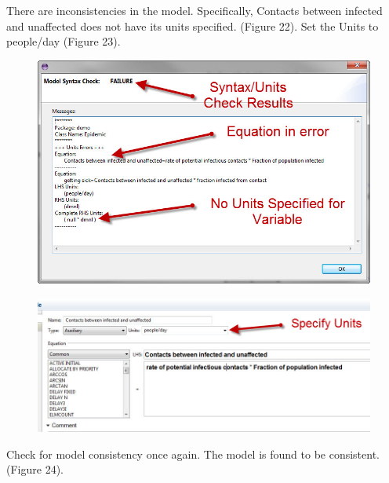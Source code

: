 \documentclass[11pt]{amsart}
\begin{document}
There are inconsistencies in the model. Specifically, Contacts between infected and unaffected does not have its units specified. (Figure 22). Set the Units to people/day (Figure 23).

\clearpage


\begin{figure}[ht]
\begin{center}
\vspace{.2in}
\centerline {
\includegraphics[totalheight=0.3\textheight]{images/022.jpg}
}
\caption{}
\label{fig:022}
\end{center}
\end{figure}




\begin{figure}[ht]
\begin{center}
\vspace{.2in}
\centerline {
\includegraphics[totalheight=0.3\textheight]{images/023.jpg}
}
\caption{}
\label{fig:023}
\end{center}
\end{figure}

Check for model consistency once again. The model is found to be consistent. (Figure 24).
\end{document}
